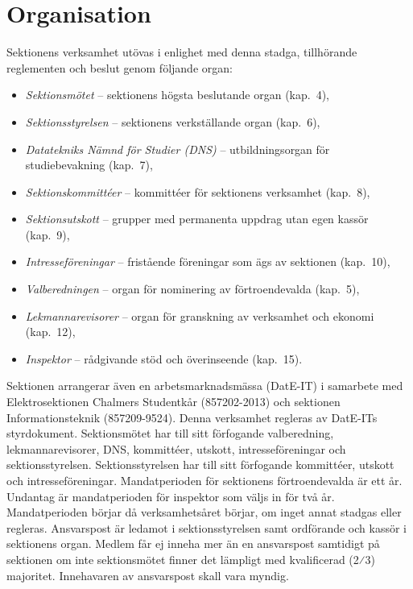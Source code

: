 \documentclass[a4paper]{dteklag}
\begin{document}
\section{Organisation}
 Sektionens verksamhet utövas i enlighet med denna stadga, tillhörande reglementen och beslut genom följande organ:
\begin{itemize}\setlength\itemsep{0em}
\item \textit{Sektionsmötet} – sektionens högsta beslutande organ (kap.~4),
\item \textit{Sektionsstyrelsen} – sektionens verkställande organ (kap.~6),
\item \textit{Datatekniks Nämnd för Studier (DNS)} – utbildningsorgan för studiebevakning (kap.~7),
\item \textit{Sektionskommittéer} – kommittéer för sektionens verksamhet (kap.~8),
\item \textit{Sektionsutskott} – grupper med permanenta uppdrag utan egen kassör (kap.~9),
\item \textit{Intresseföreningar} – fristående föreningar som ägs av sektionen (kap.~10),
\item \textit{Valberedningen} – organ för nominering av förtroendevalda (kap.~5),
\item \textit{Lekmannarevisorer} – organ för granskning av verksamhet och ekonomi (kap.~12),
\item \textit{Inspektor} – rådgivande stöd och överinseende (kap.~15).
\end{itemize}
\stycke Sektionen arrangerar även en arbetsmarknadsmässa (DatE-IT) i samarbete med Elektrosektionen Chalmers Studentkår (857202-2013) och sektionen Informationsteknik (857209-9524). Denna verksamhet regleras av DatE-ITs styrdokument. 
\para[Ansvarsförhållanden] Sektionsmötet har till sitt förfogande valberedning, lekmannarevisorer, DNS, kommittéer, utskott, intresseföreningar och sektionsstyrelsen.
\para Sektionsstyrelsen har till sitt förfogande kommittéer, utskott och intresseföreningar.
\para [Mandatperiod] Mandatperioden för sektionens förtroendevalda är ett år. 
\stycke Undantag är mandatperioden för inspektor som väljs in för två år.
\para Mandatperioden börjar då verksamhetsåret börjar, om inget annat stadgas eller regleras.
\para[Ansvarspost] Ansvarspost är ledamot i sektionsstyrelsen samt ordförande och kassör i sektionens organ.
\para Medlem får ej inneha mer än en ansvarspost samtidigt på sektionen om inte sektionsmötet finner det lämpligt med kvalificerad (2⁄3) majoritet.
\para Innehavaren av ansvarspost skall vara myndig.
\end{document}
